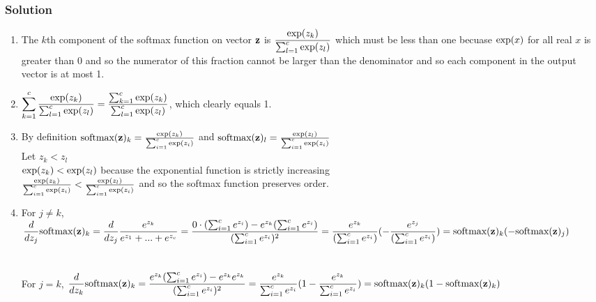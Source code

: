 \documentclass[submit]{harvardml}
\begin{document}
\subsubsection*{Solution}
\begin{enumerate}
\item The $k$th component of the softmax function on vector $\mathbf{z}$ is $\dfrac{\textup{exp}(z_k)}{\sum_{l = 1}^{c}\textup{exp}(z_l)}$  which must be less than one becuase $\textup{exp}(x)$ for all real $x$ is greater than 0 and so the numerator of this fraction cannot be larger than the denominator and so each component in the output vector is at most 1.  

\item $\displaystyle\sum_{k=1}^{c}\dfrac{\textup{exp}(z_k)}{\sum_{l = 1}^{c}\textup{exp}(z_l)} = \dfrac{\sum_{k=1}^{c}\textup{exp}(z_k)}{\sum_{l = 1}^{c}\textup{exp}(z_l)}$, which clearly equals 1. 

\item  By definition $\textup{softmax}(\mathbf{z})_k = \frac{\textup{exp}(z_k)}{\sum_{i = 1}^{c}\textup{exp}(z_i)}$ and $\textup{softmax}(\mathbf{z})_l = \frac{\textup{exp}(z_l)}{\sum_{i = 1}^{c}\textup{exp}(z_i)}$ \\
Let $z_k < z_l$ \\
$\textup{exp}(z_k) < \textup{exp}(z_l)$ because the exponential function is strictly increasing\\
$\frac{\textup{exp}(z_k)}{\sum_{i = 1}^{c}\textup{exp}(z_i)} < \frac{\textup{exp}(z_l)}{\sum_{i = 1}^{c}\textup{exp}(z_i)}$ and so the softmax function preserves order.  \\

\item For $j\neq k$, $\dfrac{d}{dz_j} \textup{softmax}(\mathbf{z})_k \\\\ = \dfrac{d}{dz_j}\dfrac{e^{z_k}}{e^{z_1}+...+e^{z_c}} \\\\ = \dfrac{0 \cdot (\sum_{i = 1}^{c}e^{z_i}) - e^{z_k}(\sum_{i=1}^{c}e^{z_i})}{(\sum_{i=1}^{c}e^{z_i})^2} \\\\ = \dfrac{e^{z_k}}{(\sum_{i=1}^{c}e^{z_i})}(-\dfrac{e^{z_j}}{(\sum_{i=1}^{c}e^{z_i})}) \\\\ = \textup{softmax}(\mathbf{z})_k(-\textup{softmax}(\mathbf{z})_j)$ \\\\
\\
For $j = k$, $\dfrac{d}{dz_k} \textup{softmax}(\mathbf{z})_k \\\\ = \dfrac{e^{z_k}(\sum_{i=1}^{c}e^{z_i}) - e^{z_k}e^{z_k}}{(\sum_{i=1}^{c}e^{z_i})^2} \\\\ = \dfrac{e^{z_k}}{\sum_{i=1}^{c}e^{z_i}}(1 - \dfrac{e^{z_k}}{\sum_{i=1}^{c}e^{z_i}}) \\\\ = \textup{softmax}(\mathbf{z})_k(1 - \textup{softmax}(\mathbf{z})_k)$ 


\end{enumerate}
\end{document}
